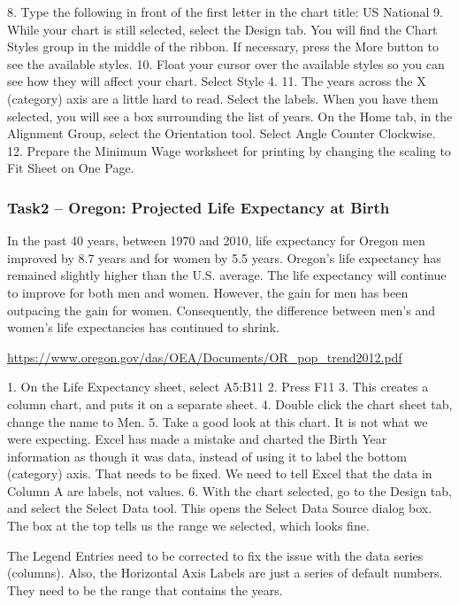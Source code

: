 8. Type the following in front of the first letter in the chart title: US National
9. While your chart is still selected, select the Design tab. You will find the Chart Styles group in
the middle of the ribbon. If necessary, press the More button to see the available styles.
10. Float your cursor over the available styles so you can see how they will affect your chart. Select
Style 4.
11. The years across the X (category) axis are a little hard to read.
Select the labels. When you have them selected, you will see a box surrounding the list of years.
On the Home tab, in the Alignment Group, select the Orientation tool. Select Angle Counter
Clockwise.
12. Prepare the Minimum Wage worksheet for printing by changing the scaling to Fit Sheet on
One Page.

\subsubsection{Task2 – Oregon: Projected Life Expectancy at Birth}

In the past 40 years, between 1970 and 2010, life expectancy for Oregon men improved by 8.7 years
and for women by 5.5 years. Oregon’s life expectancy has remained slightly higher than the U.S.
average. The life expectancy will continue to improve for both men and women. However, the gain
for men has been outpacing the gain for women. Consequently, the difference between men’s and
women’s life expectancies has continued to shrink.

\url{https://www.oregon.gov/das/OEA/Documents/OR_pop_trend2012.pdf}

1. On the Life Expectancy sheet, select A5:B11
2. Press F11
3. This creates a column chart, and puts it on a separate sheet.
4. Double click the chart sheet tab, change the name to Men.
5. Take a good look at this chart. It is not what we were expecting. Excel has made a mistake and
charted the Birth Year information as though it was data, instead of using it to label the bottom
(category) axis. That needs to be fixed. We need to tell Excel that the data in Column A are labels,
not values.
6. With the chart selected, go to the Design tab, and select the Select Data tool.
This opens the Select Data Source dialog box. The box at the top tells us the range we selected,
which looks fine.

The Legend Entries need to be corrected to fix the issue with the data series (columns). Also, the
Horizontal Axis Labels are just a series of default numbers. They need to be the range that contains
the years.

